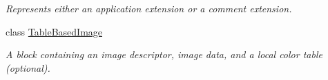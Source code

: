 \begin{DoxyCompactItemize}
\begin{DoxyCompactList}\small\item\em Represents either an application extension or a comment extension. \end{DoxyCompactList}\item 
class \hyperlink{classvcvj_1_1_models_1_1_grammatical___components_1_1_table_based_image}{Table\+Based\+Image}
\begin{DoxyCompactList}\small\item\em A block containing an image descriptor, image data, and a local color table (optional). \end{DoxyCompactList}\end{DoxyCompactItemize}
